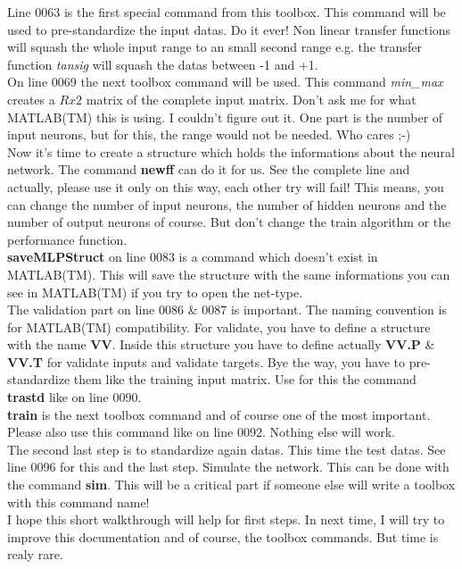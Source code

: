 Line 0063 is the first special command from this toolbox. This command will be used to pre-standardize the input datas. Do it ever! Non linear transfer functions will squash the whole input range to an small second range e.g. the transfer function \textit{tansig} will squash the datas between -1 and +1.\\

On line 0069 the next toolbox command will be used. This command \textit{min\_max} creates a $Rx2$ matrix of the complete input matrix. Don't ask me for what MATLAB(TM) this is using. I couldn't figure out it. One part is the number of input neurons, but for this, the range would not be needed. Who cares ;-)\\

Now it's time to create a structure which holds the informations about the neural network. The command \textbf{newff} can do it for us. See the complete line and actually, please use it only on this way, each other try will fail! This means, you can change the number of input neurons, the number of hidden neurons and the number of output neurons of course. But don't change the train algorithm or the performance function.\\

\textbf{saveMLPStruct} on line 0083 is a command which doesn't exist in MATLAB(TM). This will save the structure with the same informations you can see in MATLAB(TM) if you try to open the net-type.\\

The validation part on line 0086 \& 0087 is important. The naming convention is for MATLAB(TM) compatibility. For validate, you have to define a structure with the name \textbf{VV}. Inside this structure you have to define actually \textbf{VV.P} \& \textbf{VV.T} for validate inputs and validate targets. Bye the way, you have to pre-standardize them like the training input matrix. Use for this the command \textbf{trastd} like on line 0090.\\

\textbf{train} is the next toolbox command and of course one of the most important. Please also use this command like on line 0092. Nothing else will work.\\

The second last step is to standardize again datas. This time the test datas. See line 0096 for this and the last step. Simulate the network. This can be done with the command \textbf{sim}. This will be a critical part if someone else will write a toolbox with this command name!\\

I hope this short walkthrough will help for first steps. In next time, I will try to improve this documentation and of course, the toolbox commands. But time is realy rare.


